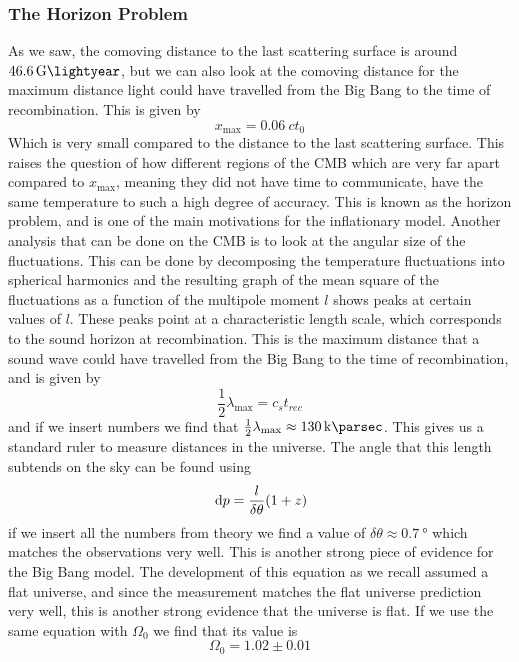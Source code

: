 \subsubsection{The Horizon Problem}
As we saw, the comoving distance to the last scattering surface is around \(\qty{46.6}{\giga\lightyear}\), but we can also look at the comoving distance for the maximum distance light could have travelled from the Big Bang to the time of recombination. This is given by
\begin{equation}
    x_{\max} = \qty{0.06}{} ct_0
\end{equation}
Which is very small compared to the distance to the last scattering surface. This raises the question of how different regions of the CMB which are very far apart compared to \(x_{\max}\), meaning they did not have time to communicate, have the same temperature to such a high degree of accuracy. This is known as the horizon problem, and is one of the main motivations for the inflationary model. Another analysis that can be done on the CMB is to look at the angular size of the fluctuations. This can be done by decomposing the temperature fluctuations into spherical harmonics and the resulting graph of the mean square of the fluctuations as a function of the multipole moment \(l\) shows peaks at certain values of \(l\). These peaks point at a characteristic length scale, which corresponds to the sound horizon at recombination. This is the maximum distance that a sound wave could have travelled from the Big Bang to the time of recombination, and is given by
\begin{equation}
    \frac{1}{2}\lambda_{\max} = c_s t_{rec}
\end{equation}
and if we insert numbers we find that \(\frac{1}{2}\lambda_{\max} \approx \qty{130}{\kilo\parsec}\). This gives us a standard ruler to measure distances in the universe. The angle that this length subtends on the sky can be found using
\begin{equation}
    \dl p = \frac{l}{\delta \theta} (1+z)
\end{equation}
if we insert all the numbers from theory we find a value of \(\delta \theta \approx \qty{0.7}{\degree}\) which matches the observations very well. This is another strong piece of evidence for the Big Bang model. The development of this equation as we recall assumed a flat universe, and since the measurement matches the flat universe prediction very well, this is another strong evidence that the universe is flat. If we use the same equation with \(\Omega_0\) we find that its value is
\begin{equation}
    \Omega_0 = 1.02 \pm 0.01
\end{equation}
